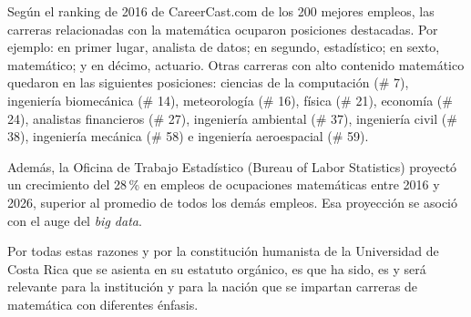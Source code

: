 Según el ranking de 2016 de CareerCast.com de los 200 mejores empleos, las carreras relacionadas con la matemática ocuparon posiciones destacadas. Por ejemplo: en primer lugar, analista de datos; en segundo, estadístico; en sexto, matemático; y en décimo, actuario. Otras carreras con alto contenido matemático quedaron en las siguientes posiciones: ciencias de la computación (\# 7), ingeniería biomecánica (\# 14), meteorología (\# 16), física (\# 21), economía (\# 24), analistas financieros (\# 27), ingeniería ambiental (\# 37), ingeniería civil (\# 38), ingeniería mecánica (\# 58) e ingeniería aeroespacial (\# 59). 

Además, la Oficina de Trabajo Estadístico (Bureau of Labor Statistics) proyectó un crecimiento del 28\,\% en empleos de ocupaciones matemáticas entre 2016 y 2026, superior al promedio de todos los demás empleos. Esa proyección se asoció con el auge del \emph{big data}. 

Por todas estas razones y por la constitución humanista de la Universidad de Costa Rica que se asienta en su estatuto orgánico, es que ha sido, es y será relevante para la institución y para la nación que se impartan carreras de matemática con diferentes énfasis.

